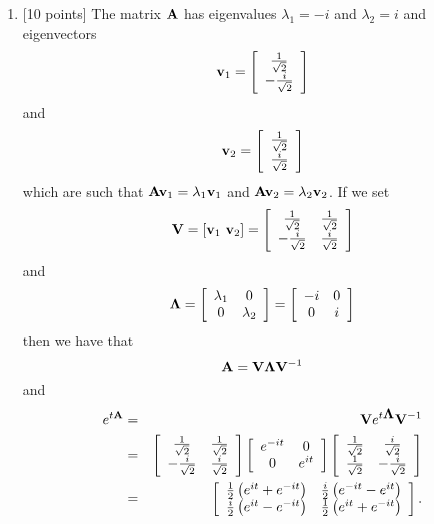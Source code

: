 \begin{solution}
\begin{enumerate}
\item {[10 points]} The matrix ${\bf A}$ has eigenvalues $\lambda_1 = -i$ and $\lambda_2 = i$ and eigenvectors
\[
{\bf v}_1 = \left[\begin{array}{c}{1\over\sqrt{2}} \\ -{i\over\sqrt{2}}\end{array}\right]
\]
and
\[
{\bf v}_2 = \left[\begin{array}{c}{1\over\sqrt{2}} \\ {i\over\sqrt{2}}\end{array}\right]
\]
which are such that ${\bf A}{\bf v}_1=\lambda_1{\bf v}_1$ and ${\bf A}{\bf v}_2=\lambda_2{\bf v}_2$. If we set
\[
\BV = [\Bv_1\ \Bv_2]=\left[\begin{array}{cc}{1\over\sqrt{2}} & {1\over\sqrt{2}} \\ -{i\over\sqrt{2}} & {i\over\sqrt{2}}\end{array}\right]
\]
and
\[
\mbox{\boldmath$\Lambda$} = \left[\begin{array}{cc}\lambda_1 & 0 \\ 0 & \lambda_2\end{array}\right]=\left[\begin{array}{cc}-i & 0 \\ 0 & i\end{array}\right]
\]
then we have that
\[
{\bf A} = {\bf V}\mbox{\boldmath$\Lambda$}{\bf V}^{-1}
\]
and
\begin{eqnarray*}
e^{t\BA}&=&\BV e^{t\BLambda} \BV^{-1}
\\
&=&\left[\begin{array}{cc}{1\over\sqrt{2}} & {1\over\sqrt{2}} \\ -{i\over\sqrt{2}} & {i\over\sqrt{2}}\end{array}\right] \left[\begin{array}{cc}e^{-it} & 0 \\ 0 & e^{it}\end{array}\right] \left[\begin{array}{cc}{1\over\sqrt{2}} & {i\over\sqrt{2}} \\ {1\over\sqrt{2}} & -{i\over\sqrt{2}}\end{array}\right]
\\
&=&\left[\begin{array}{cc}{1\over2}\left(e^{it} + e^{-it}\right) & {i\over2}\left(e^{-it} - e^{it}\right) \\ {i\over2}\left(e^{it}-e^{-it}\right) & {1\over2}\left(e^{it}+e^{-it}\right)\end{array}\right].

\end{eqnarray*}
\end{enumerate}
\end{solution}
